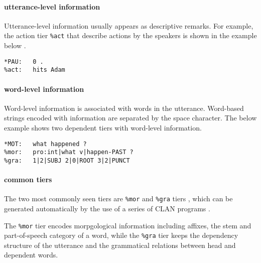 \paragraph{utterance-level information}
Utterance-level information usually appears as descriptive remarks. For example, the action tier \texttt{\%act} that describe actions by the speakers is shown in the example below .\\

\lstset{
numbers = none,
frame = single,
}

\begin{lstlisting}[caption={Example of a dependent tier with utterance-level information.}, label={lst:chatsent1}]
*PAU:   0 .
%act:   hits Adam
\end{lstlisting}


\paragraph{word-level information}
Word-level information is associated with words in the utterance. Word-based strings encoded with information are separated by the space character. The below example  shows two dependent tiers with word-level information.\\

\lstset{
numbers = none,
frame = single,
}

\begin{lstlisting}[caption={Example of dependent tiers with word-level information}, label={lst:chatsent2}]
*MOT:   what happened ?
%mor:   pro:int|what v|happen-PAST ?
%gra:   1|2|SUBJ 2|0|ROOT 3|2|PUNCT
\end{lstlisting}

\paragraph{common tiers}
The two most commonly seen tiers are \texttt{\%mor} and \texttt{\%gra} tiers , which can be generated automatically by the use of a series of CLAN programs .

The \texttt{\%mor} tier encodes morpgological information including affixes, the stem and part-of-speech category of a word, while the \texttt{\%gra} tier keeps the dependency structure of the utterance and the grammatical relations between head and dependent words.\\

